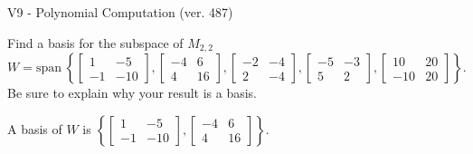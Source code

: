 \begin{exercise}
  \begin{exerciseTitle}V9 - Polynomial Computation (ver. 487)\end{exerciseTitle}
  \begin{exerciseStatement}
    Find a basis for the subspace of \(M_{2,2}\) 
\[W=\mathrm{span}\ \left\{\left[\begin{array}{cc}
1 & -5 \\
-1 & -10
\end{array}\right] , \left[\begin{array}{cc}
-4 & 6 \\
4 & 16
\end{array}\right] , \left[\begin{array}{cc}
-2 & -4 \\
2 & -4
\end{array}\right] , \left[\begin{array}{cc}
-5 & -3 \\
5 & 2
\end{array}\right] , \left[\begin{array}{cc}
10 & 20 \\
-10 & 20
\end{array}\right]\right\}.\]
 Be sure to explain why your result is a basis.


  \end{exerciseStatement}
  \begin{exerciseAnswer}
   A basis of \(W\) is  \(\left\{\left[\begin{array}{cc}
1 & -5 \\
-1 & -10
\end{array}\right] , \left[\begin{array}{cc}
-4 & 6 \\
4 & 16
\end{array}\right]\right\}\).
  


  \end{exerciseAnswer}
\end{exercise}